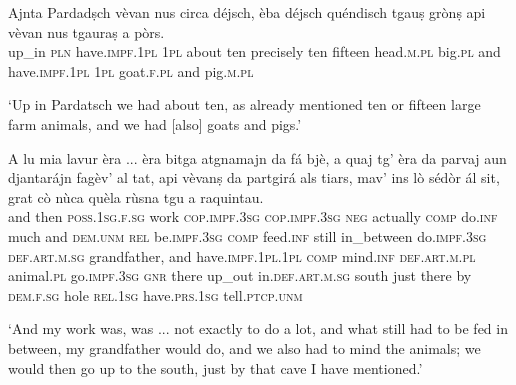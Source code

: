 \begin{linenumbers}
\gll  Ajnta Pardadṣch vèvan nus circa déjsch, èba déjsch quéndisch tgauṣ grònṣ api vèvan nus tgauraṣ a pòrs.  \\
up\_in \textsc{pln} have.\textsc{impf.1pl} \textsc{1pl} about ten precisely ten fifteen head.\textsc{m.pl} big.\textsc{pl} and have.\textsc{impf.1pl} \textsc{1pl} goat.\textsc{f.pl} and pig.\textsc{m.pl} \\
\end{linenumbers}
\medskip
\glt `Up in Pardatsch we had about ten, as already mentioned ten or fifteen large farm animals, and we had [also] goats and pigs.'
\medskip

\begin{linenumbers}
\gll A lu mia lavur èra ... èra bitga atgnamajn da fá bjè, a quaj tg’ èra da parvaj aun djantarájn fagèv’ al tat, api vèvanṣ da partgirá als tiars, mav’ ins lò sédòr ál sit, grat cò nùca quèla rùsna tgu a raquintau.\\
and then \textsc{poss.1sg.f.sg} work \textsc{cop.impf.3sg} {} \textsc{cop.impf.3sg} \textsc{neg} actually \textsc{comp} do.\textsc{inf} much and \textsc{dem.unm} \textsc{rel} be.\textsc{impf.3sg} \textsc{comp} feed.\textsc{inf} still in\_between do.\textsc{impf.3sg} \textsc{def.art.m.sg} grandfather, and have.\textsc{impf.1pl.1pl} \textsc{comp} mind.\textsc{inf} \textsc{def.art.m.pl} animal.\textsc{pl} go.\textsc{impf.3sg} \textsc{gnr} there up\_out in.\textsc{def.art.m.sg} south just there by \textsc{dem.f.sg} hole \textsc{rel.1sg} have.\textsc{prs.1sg} tell.\textsc{ptcp.unm}\\  
\end{linenumbers}
\medskip
\glt `And my work was, was ... not exactly to do a lot, and what still had to be fed in between, my grandfather would do, and we also had to mind the animals; we would then go up to the south, just by that cave I have mentioned.'
\medskip

